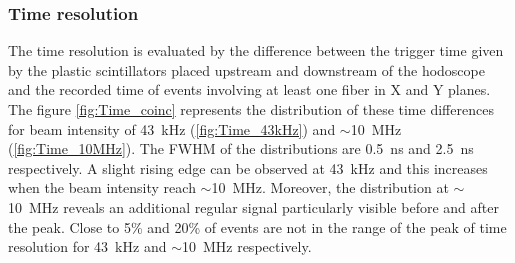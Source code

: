\documentclass[a4paper,11pt]{article}
\begin{document}
\subsubsection{Time resolution}
The time resolution is evaluated by the difference between the trigger time given by the plastic scintillators placed upstream and downstream of the hodoscope and the recorded time of events involving at least one fiber in X and Y planes. The figure \ref{fig:Time_coinc} represents the distribution of these time differences for beam intensity of 43~kHz (\ref{fig:Time_43kHz}) and $\sim$10~MHz (\ref{fig:Time_10MHz}). The FWHM of the distributions are 0.5~ns and 2.5~ns respectively. A slight rising edge can be observed at 43~kHz and this increases when the beam intensity reach $\sim$10~MHz. Moreover, the distribution at $\sim$10~MHz reveals an additional regular signal particularly visible before and after the peak. Close to 5\% and 20\% of events are not in the range of the peak of time resolution for 43~kHz and $\sim$10~MHz respectively.
\label{Time_resolution}
\end{document}
